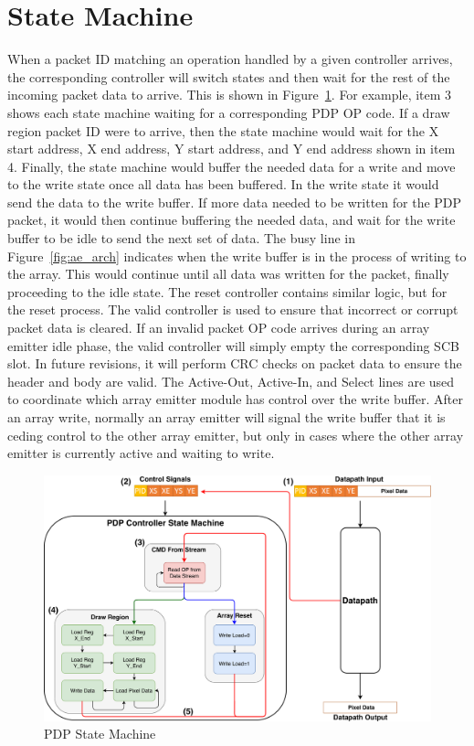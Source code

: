 \section{State Machine}
    When a packet ID matching an operation handled by a given controller arrives, the corresponding controller will switch states and then wait for the rest of the incoming packet data to arrive. This is shown in Figure~\ref{fig:state_machine}. For example, item 3 shows each state machine waiting for a corresponding PDP OP code. If a draw region packet ID were to arrive, then the state machine would wait for the X start address, X end address, Y start address, and Y end address shown in item 4. Finally, the state machine would buffer the needed data for a write and move to the write state once all data has been buffered. In the write state it would send the data to the write buffer. If more data needed to be written for the PDP packet, it would then continue buffering the needed data, and wait for the write buffer to be idle to send the next set of data. The busy line in Figure~\ref{fig:ae_arch} indicates when the write buffer is in the process of writing to the array. This would continue until all data was written for the packet, finally proceeding to the idle state. The reset controller contains similar logic, but for the reset process. The valid controller is used to ensure that incorrect or corrupt packet data is cleared. If an invalid packet OP code arrives during an array emitter idle phase, the valid controller will simply empty the corresponding SCB slot. In future revisions, it will perform CRC checks on packet data to ensure the header and body are valid. The Active-Out, Active-In, and Select lines are used to coordinate which array emitter module has control over the write buffer. After an array write, normally an array emitter will signal the write buffer that it is ceding control to the other array emitter, but only in cases where the other array emitter is currently active and waiting to write.

    \begin{figure}
        \centering
        \includegraphics[width=1.0\textwidth]{fig/pdp_state_machine.pdf}
        \caption{PDP State Machine}
        \label{fig:state_machine}
    \end{figure}
